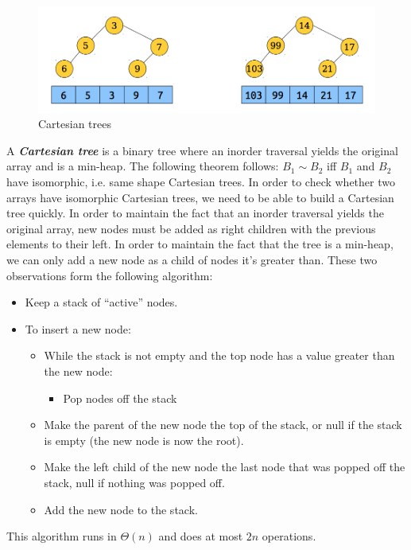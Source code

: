 \documentclass[11pt, oneside]{article}
\newcommand{\emphasis}[1]{\textbf{\textit{#1}}}
\begin{document}
\begin{figure}[h!]
\centering
\includegraphics[scale=0.25]{cartesian}
\caption{Cartesian trees}
\end{figure}

A \emphasis{Cartesian tree} is a binary tree where an inorder traversal yields the original array and is a min-heap.
The following theorem follows: \( B_1 \sim B_2 \) iff \( B_1 \) and \( B_2 \)
have isomorphic, i.e. same shape Cartesian trees.
In order to check whether two arrays have isomorphic Cartesian trees, we need to be able to
build a Cartesian tree quickly.
In order to maintain the fact that an inorder traversal yields the original array,
new nodes must be added as right children with the previous elements to their left.
In order to maintain the fact that the tree is a min-heap,
we can only add a new node as a child of nodes it's greater than.
These two observations form the following algorithm:
\begin{itemize}
  \item Keep a stack of ``active'' nodes.
  \item To insert a new node:
    \begin{itemize}
      \item While the stack is not empty and the top node has a value greater than the new node:
      \begin{itemize}
        \item Pop nodes off the stack
      \end{itemize}
      \item Make the parent of the new node the top of the stack, or null
      if the stack is empty (the new node is now the root).
      \item Make the left child of the new node the last node that was popped off the stack,
      null if nothing was popped off.
      \item Add the new node to the stack.
    \end{itemize}
\end{itemize}

This algorithm runs in \( \Theta(n) \) and does at most \( 2n \) operations.
\end{document}
